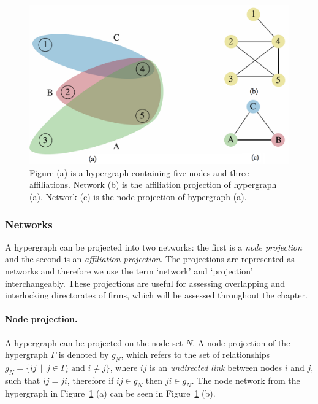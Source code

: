 \begin{figure}[t]
\begin{center}
\includegraphics[scale=0.28]{imgs/hypergraph.png}
\end{center}
\caption[Hypergraph and network projections]{Figure (a) is a hypergraph containing five nodes and three affiliations. Network (b) is the affiliation projection of hypergraph (a). Network (c) is the node projection of hypergraph (a).}
\label{hypergraph}
\end{figure}

\subsubsection*{Networks}

A hypergraph can be projected into two networks: the first is a \emph{node projection} and the second is an \emph{affiliation projection}. The projections are represented as networks and therefore we use the term `network' and `projection' interchangeably. These projections are useful for assessing overlapping and interlocking directorates of firms, which will be assessed throughout the chapter.

\paragraph{Node projection.}

A hypergraph can be projected on the node set $N$. A node projection of the hypergraph $\Gamma$ is denoted by $g_N$, which refers to the set of relationships $g_N = \{ij \, \mid \, j \in \overline{\Gamma}_{i} \mbox{ and } i \neq j \}$, where $ij$ is an \emph{undirected link} between nodes $i$ and $j$, such that $ij = ji$, therefore if $ij \in g_{N}$ then $ji \in g_{N}$. The node network from the hypergraph in Figure~\ref{hypergraph} (a) can be seen in Figure~\ref{hypergraph} (b).

